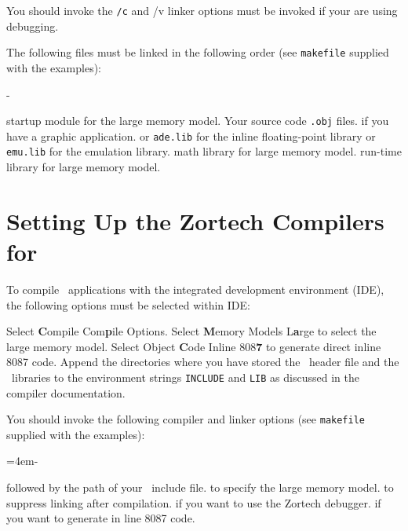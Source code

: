 \documentclass[12pt]{book}
\begin{document}
You should invoke the {\tt /c} and {/v} linker options must be invoked
if your are using debugging.

The following files must be linked in the following order
(see {\tt makefile} supplied with the examples):
\par{\openup-\spread\openup -2pt
\begin{description}
 startup module for the large memory model.
Your source code {\tt .obj} files.
 if you have a graphic application.
 or {\tt ade.lib}
 for the inline floating-point library or 
{\tt emu.lib} for the emulation library.
 math library for large memory model. 
 run-time library for large memory model.
\end{description}
\par}

\section{Setting Up the Zortech Compilers for \AD}
To compile \AD\ applications with the integrated development environment
(IDE), the following options must be selected within IDE:
\begin{description}
\myitem{---}Select {\bf C}ompile Com{\bf p}ile Options. 
Select {\bf M}emory Models L{\bf a}rge to select the large memory model.
Select Object {\bf C}ode Inline 808{\bf 7} to generate direct inline 8087 code.
\myitem{---}Append the directories where you have stored the \AD\ header
file and the \AD\ libraries to the environment strings {\tt INCLUDE} and
{\tt LIB} as discussed in the compiler documentation.
\end{description}

You should invoke the following
compiler and linker options (see {\tt makefile} supplied with the examples):
\par{\parindent=4em\openup-\spread\openup -2pt
\begin{description}
 followed by the path of your \AD\ include file.
 to specify the large memory model.
 to suppress linking after compilation.
 if you want to use the Zortech debugger.
 if you want to generate in line 8087 code.
\end{description}
\par}
\end{document}
